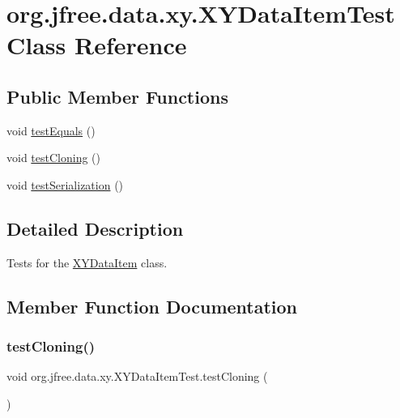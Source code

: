 \hypertarget{classorg_1_1jfree_1_1data_1_1xy_1_1_x_y_data_item_test}{}\section{org.\+jfree.\+data.\+xy.\+X\+Y\+Data\+Item\+Test Class Reference}
\label{classorg_1_1jfree_1_1data_1_1xy_1_1_x_y_data_item_test}
\subsection*{Public Member Functions}
\begin{DoxyCompactItemize}
\item 
void \mbox{\hyperlink{classorg_1_1jfree_1_1data_1_1xy_1_1_x_y_data_item_test_a8bd65db4f4e294074c48782f48483d9a}{test\+Equals}} ()
\item 
void \mbox{\hyperlink{classorg_1_1jfree_1_1data_1_1xy_1_1_x_y_data_item_test_a91a9526dbaafe191ac833f098f382453}{test\+Cloning}} ()
\item 
void \mbox{\hyperlink{classorg_1_1jfree_1_1data_1_1xy_1_1_x_y_data_item_test_ae57b1a9296929de01f1cab5d73e33a36}{test\+Serialization}} ()
\end{DoxyCompactItemize}


\subsection{Detailed Description}
Tests for the \mbox{\hyperlink{classorg_1_1jfree_1_1data_1_1xy_1_1_x_y_data_item}{X\+Y\+Data\+Item}} class. 

\subsection{Member Function Documentation}
\mbox{\label{classorg_1_1jfree_1_1data_1_1xy_1_1_x_y_data_item_test_a91a9526dbaafe191ac833f098f382453}} 
\subsubsection{\texorpdfstring{test\+Cloning()}{testCloning()}}
{\footnotesize\ttfamily void org.\+jfree.\+data.\+xy.\+X\+Y\+Data\+Item\+Test.\+test\+Cloning (\begin{DoxyParamCaption}{ }\end{DoxyParamCaption})}

